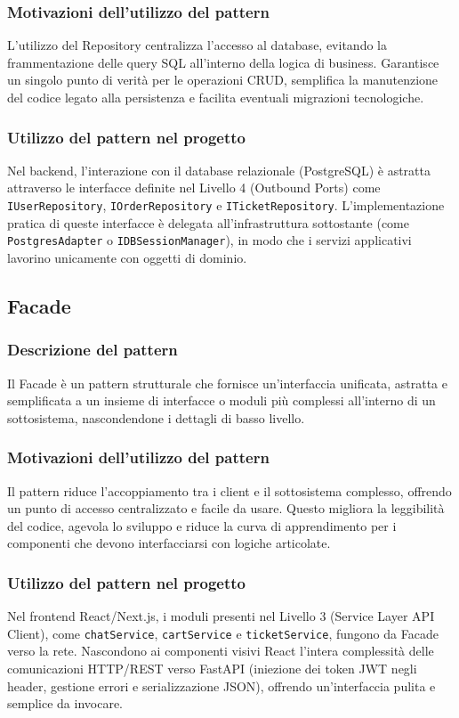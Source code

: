 \documentclass[a4paper, 11pt, oneside]{scrartcl}
\begin{document}
\subsubsection{Motivazioni dell'utilizzo del pattern}
L'utilizzo del Repository centralizza l'accesso al database, evitando la frammentazione delle query SQL all'interno della logica di business. Garantisce un singolo punto di verità per le operazioni CRUD, semplifica la manutenzione del codice legato alla persistenza e facilita eventuali migrazioni tecnologiche.

\subsubsection{Utilizzo del pattern nel progetto}
Nel backend, l'interazione con il database relazionale (PostgreSQL) è astratta attraverso le interfacce definite nel Livello 4 (Outbound Ports) come \texttt{IUserRepository}, \texttt{IOrderRepository} e \texttt{ITicketRepository}. L'implementazione pratica di queste interfacce è delegata all'infrastruttura sottostante (come \texttt{PostgresAdapter} o \texttt{IDBSessionManager}), in modo che i servizi applicativi lavorino unicamente con oggetti di dominio.

\subsection{Facade}

\subsubsection{Descrizione del pattern}
Il Facade è un pattern strutturale che fornisce un'interfaccia unificata, astratta e semplificata a un insieme di interfacce o moduli più complessi all'interno di un sottosistema, nascondendone i dettagli di basso livello.

\subsubsection{Motivazioni dell'utilizzo del pattern}
Il pattern riduce l'accoppiamento tra i client e il sottosistema complesso, offrendo un punto di accesso centralizzato e facile da usare. Questo migliora la leggibilità del codice, agevola lo sviluppo e riduce la curva di apprendimento per i componenti che devono interfacciarsi con logiche articolate.

\subsubsection{Utilizzo del pattern nel progetto}
Nel frontend React/Next.js, i moduli presenti nel Livello 3 (Service Layer API Client), come \texttt{chatService}, \texttt{cartService} e \texttt{ticketService}, fungono da Facade verso la rete. Nascondono ai componenti visivi React l'intera complessità delle comunicazioni HTTP/REST verso FastAPI (iniezione dei token JWT negli header, gestione errori e serializzazione JSON), offrendo un'interfaccia pulita e semplice da invocare.
\end{document}
